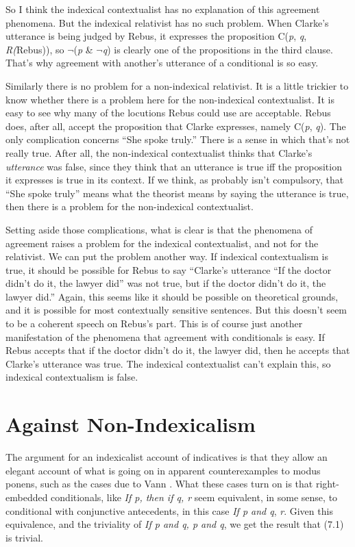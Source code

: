 So I think the indexical contextualist has no explanation of this agreement phenomena. But the indexical relativist has no such problem. When Clarke's utterance is being judged by Rebus, it expresses the proposition C(\textit{p}, \textit{q}, \textit{R(}Rebus)), so \(\neg\){}(\textit{p} \& \(\neg\){}\textit{q}) is clearly one of the propositions in the third clause. That's why agreement with another's utterance of a conditional is so easy.

Similarly there is no problem for a non-indexical relativist. It is a little trickier to know whether there is a problem here for the non-indexical contextualist. It is easy to see why many of the locutions Rebus could use are acceptable. Rebus does, after all, accept the proposition that Clarke expresses, namely C(\textit{p}, \textit{q}). The only complication concerns ``She spoke truly.'' There is a sense in which that's not really true. After all, the non-indexical contextualist thinks that Clarke's \textit{utterance} was false, since they think that an utterance is true iff the proposition it expresses is true in its context. If we think, as probably isn't compulsory, that ``She spoke truly'' means what the theorist means by saying the utterance is true, then there is a problem for the non-indexical contextualist.

Setting aside those complications, what is clear is that the phenomena of agreement raises a problem for the indexical contextualist, and not for the relativist. We can put the problem another way. If indexical contextualism is true, it should be possible for Rebus to say ``Clarke's utterance ``If the doctor didn't do it, the lawyer did'' was not true, but if the doctor didn't do it, the lawyer did.'' Again, this seems like it should be possible on theoretical grounds, and it is possible for most contextually sensitive sentences. But this doesn't seem to be a coherent speech on Rebus's part. This is of course just another manifestation of the phenomena that agreement with conditionals is easy. If Rebus accepts that if the doctor didn't do it, the lawyer did, then he accepts that Clarke's utterance was true. The indexical contextualist can't explain this, so indexical contextualism is false.


\section{Against Non-Indexicalism}

The argument for an indexicalist account of indicatives is that they allow an elegant account of what is going on in apparent counterexamples to modus ponens, such as the cases due to Vann \cite{McGee1985}. What these cases turn on is that right-embedded conditionals, like \textit{If p, then if q, r} seem equivalent, in some sense, to conditional with conjunctive antecedents, in this case \textit{If p and q}, \textit{r}. Given this equivalence, and the triviality of \textit{If p and q, p and q}, we get the result that (7.1) is trivial.

